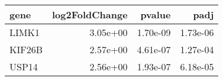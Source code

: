 \begin{tabular}{lrrr}
\toprule
  gene &  log2FoldChange &   pvalue &     padj \\
\midrule
 LIMK1 &        3.05e+00 & 1.70e-09 & 1.73e-06 \\
KIF26B &        2.57e+00 & 4.61e-07 & 1.27e-04 \\
 USP14 &        2.56e+00 & 1.93e-07 & 6.18e-05 \\
\bottomrule
\end{tabular}
